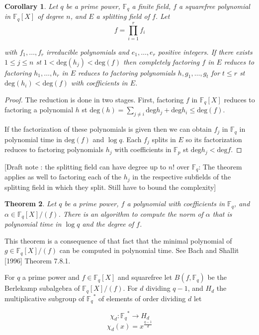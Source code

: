 \documentclass[a4paper]{article}
\newtheorem{thm}{Theorem}[section]
\newtheorem{cor}[thm]{Corollary}
\def\Fp {{ \mathbb{F} _ {p} }}
\def\Fq {{ \mathbb{F} _ {q} }}
\def\deg {{ \mathrm{deg}}}
\begin{document}
\begin{cor}
Let $q$ be a prime power, $\Fq$ a finite field, $f$ a squarefree polynomial in $\Fq[X]$ of degree $n$, and $E$ a splitting field of $f$. Let
$$f = \prod_{i=1}^r{f_i}$$

\noindent with $f_1, \ldots, f_r$ irreducible polynomials and $e_1, \ldots, e_r$ positive integers. If there exists $1 \leq j \leq n$ st $1 < \deg(h_j) < \deg(f)$ then completely factoring $f$ in $E$ reduces to factoring $h_1, \ldots, h_r$ in $E$ reduces to factoring polynomials $h, g_1, \ldots, g_t$ for $t \leq r$ st $\deg(h_i) < \deg(f)$ with coefficients in $E$.
\end{cor}

\begin{proof}
The reduction is done in two stages. First, factoring $f$ in $\Fq[X]$ reduces to factoring a polynomial $h$ st $\deg(h) = \sum_{j \neq i}{\deg h_j} + {\deg h_i} \leq \deg(f)$.
 
If the factorization of these polynomials is given then we can obtain $f_j$ in $\Fq$ in polynomial time in $\deg(f)$ and $\log q$. Each $f_j$ splits in $E$ so its factorization reduces to factoring polynomials $h_j$ with coefficients in $\Fp$ st $\deg h_j < \deg f$.
\end{proof}

[Draft note : the splitting field can have degree up to $n!$ over $\Fq$: The theorem applies as well to factoring each of the $h_j$ in the respective subfields of the splitting field in which they split. Still have to bound the complexity]

\begin{thm}
Let $q$ be a prime power, $f$ a polynomial with coefficients in $\Fq$, and $\alpha \in \Fq[X]/(f)$. There is an algorithm to compute the norm of $\alpha$ that is polynomial time in $\log q$ and the degree of $f$.
\end{thm}

This theorem is a consequence of that fact that the minimal polynomial of $g \in \Fq[X]/(f)$ can be computed in polynomial time. See Bach and Shallit [1996] Theorem 7.8.1. 

%
%
For $q$ a prime power and $f \in \Fq[X]$ and squarefree let $B(f, \Fq)$ be the Berlekamp subalgebra of $\Fq[X]/(f)$. For $d$ dividing $q - 1$, and $H_d$ the multiplicative subgroup of $\Fq^*$ of elements of order dividing $d$ let

$$\chi_d : \Fq^* \rightarrow H_d$$
$$\chi_d(x) = x^{\frac {q-1} {d}}$$
\end{document}
